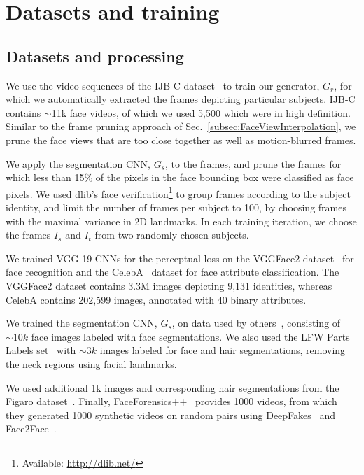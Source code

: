 \section{Datasets and training}
\label{sec:datasets_and_processing}
\subsection{Datasets and processing}
We use the video sequences of the IJB-C dataset~\cite{maze2018iarpa} to train our generator, $G_{r}$, for which we automatically extracted the frames depicting particular subjects. IJB-C contains $\sim$11k face videos, of
which we used 5,500 which were in high definition. Similar to the frame pruning approach of Sec.~\ref{subsec:FaceViewInterpolation}, we prune the face
views that are too close together as well as motion-blurred frames. 

We apply the segmentation CNN, $G_{s}$, to the frames, and prune the frames for which less than 15\% of the pixels in the face bounding box were classified as face pixels. We used dlib's face verification\footnote{Available: \url{http://dlib.net/}} to group frames according to the subject identity, and limit the number of frames per subject to 100, by choosing frames with the maximal variance in 2D landmarks. In each training iteration, we choose the frames $I_{s}$ and $I_{t}$ from two randomly chosen subjects. 

We trained VGG-19 CNNs for the perceptual loss on the VGGFace2 dataset~\cite{cao2018vggface2} for face recognition and the CelebA~\cite{liu2018large} dataset for face attribute classification. The VGGFace2 dataset contains 3.3M images depicting 9,131 identities, whereas CelebA contains 202,599 images, annotated with 40 binary attributes. 

We trained the segmentation CNN, $G_{s}$, on data used by others~\cite{nirkin2018face}, consisting of ${\sim}10k$ face images labeled with face segmentations. We also used the LFW Parts Labels set~\cite{kae2013augmenting} with ${\sim}3k$ images labeled for face and hair segmentations, removing the neck regions using facial landmarks. 

We used additional 1k images and corresponding hair segmentations from the Figaro dataset~\cite{svanera2016figaro}. Finally, FaceForensics++~\cite{roessler2019faceforensics++} provides 1000 videos, from which they generated 1000 synthetic videos on random pairs using DeepFakes~\cite{DeepFakes} and Face2Face~\cite{thies2016face2face}.%

